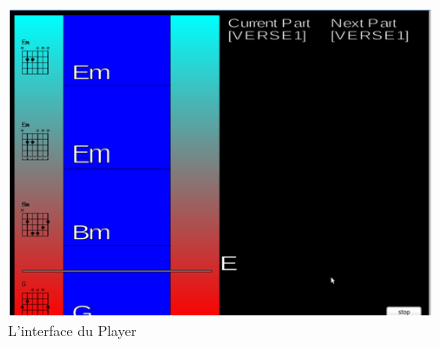 \begin{figure}[!h]
\begin{center}
\includegraphics[scale=0.8]{player.png}
\end{center}
\caption{L'interface du Player}
\end{figure}
